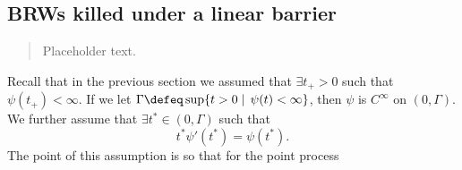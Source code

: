 \subsection{BRWs killed under a linear barrier}

\begin{quote}
{\small Placeholder text. }
\end{quote}

Recall that in the previous section we assumed that $\exists t_+ > 0$ such that $\psi(t_+) < \infty$. If we let $\Gamma \defeq \sup\{ t > 0 \mid\, \psi(t) < \infty \}$, then $\psi$ is $C^\infty$ on $(0, \Gamma)$. We further assume that $\exists t^* \in (0, \Gamma)$ such that 
\begin{equation}\label{ass:TStar}
t^* \psi'(t^*) = \psi(t^*). 
\end{equation}
The point of this assumption is so that for the point process 